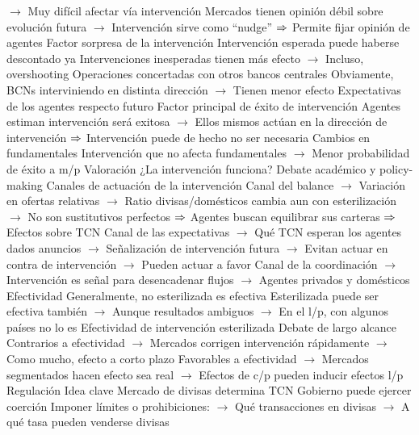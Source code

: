 \documentclass{nuevotema}
\begin{document}
\begin{esquemal}
				\4[] $\to$ Muy difícil afectar vía intervención
				\4[] Mercados tienen opinión débil sobre evolución futura
				\4[] $\to$ Intervención sirve como ``nudge''
				\4[] $\Rightarrow$ Permite fijar opinión de agentes
				\4[ii] Factor sorpresa de la intervención
				\4[] Intervención esperada puede haberse descontado ya
				\4[] Intervenciones inesperadas tienen más efecto
				\4[] $\to$ Incluso, overshooting
				\4[iii] Operaciones concertadas con otros bancos centrales
				\4[] Obviamente, BCNs interviniendo en distinta dirección
				\4[] $\to$ Tienen menor efecto
				\4[iv] Expectativas de los agentes respecto futuro
				\4[] Factor principal de éxito de intervención
				\4[] Agentes estiman intervención será exitosa
				\4[] $\to$ Ellos mismos actúan en la dirección de intervención
				\4[] $\Rightarrow$ Intervención puede de hecho no ser necesaria
				\4[v] Cambios en fundamentales
				\4[] Intervención que no afecta fundamentales
				\4[] $\to$ Menor probabilidad de éxito a m/p
			\3 Valoración
				\4 ¿La intervención funciona?
				\4[] Debate académico y policy-making
				\4 Canales de actuación de la intervención
				\4[] Canal del balance
				\4[] $\to$ Variación en ofertas relativas
				\4[] $\to$ Ratio divisas/domésticos cambia aun con esterilización
				\4[] $\to$ No son sustitutivos perfectos
				\4[] $\Rightarrow$ Agentes buscan equilibrar sus carteras
				\4[] $\Rightarrow$ Efectos sobre TCN
				\4[] Canal de las expectativas
				\4[] $\to$ Qué TCN esperan los agentes dados anuncios
				\4[] $\to$ Señalización de intervención futura
				\4[] $\to$ Evitan actuar en contra de intervención
				\4[] $\to$ Pueden actuar a favor
				\4[] Canal de la coordinación
				\4[] $\to$ Intervención es señal para desencadenar flujos
				\4[] $\to$ Agentes privados y domésticos
				\4 Efectividad
				\4[] Generalmente, no esterilizada es efectiva
				\4[] Esterilizada puede ser efectiva también
				\4[] $\to$ Aunque resultados ambiguos
				\4[] $\to$ En el l/p, con algunos países no lo es
				\4 Efectividad de intervención esterilizada
				\4[] Debate de largo alcance
				\4[] Contrarios a efectividad
				\4[] $\to$ Mercados corrigen intervención rápidamente
				\4[] $\to$ Como mucho, efecto a corto plazo
				\4[] Favorables a efectividad
				\4[] $\to$ Mercados segmentados hacen efecto sea real
				\4[] $\to$ Efectos de c/p pueden inducir efectos l/p
		\2 Regulación
			\3 Idea clave
				\4 Mercado de divisas determina TCN
				\4 Gobierno puede ejercer coerción
				\4[] Imponer límites o prohibiciones:
				\4[] $\to$ Qué transacciones en divisas
				\4[] $\to$ A qué tasa pueden venderse divisas

\end{esquemal}
\end{document}
